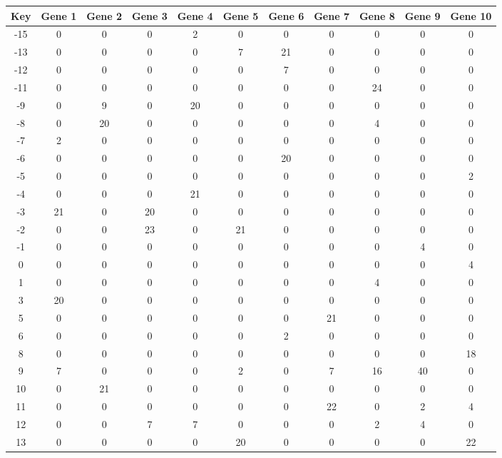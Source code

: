 \begin{tabular}{|c|c|c|c|c|c|c|c|c|c|c|}
\hline
Key & Gene 1 & Gene 2 & Gene 3 & Gene 4 & Gene 5 & Gene 6 & Gene 7 & Gene 8 & Gene 9 & Gene 10 \\
\hline
-15 & 0 & 0 & 0 & 2 & 0 & 0 & 0 & 0 & 0 & 0 \\
-13 & 0 & 0 & 0 & 0 & 7 & 21 & 0 & 0 & 0 & 0 \\
-12 & 0 & 0 & 0 & 0 & 0 & 7 & 0 & 0 & 0 & 0 \\
-11 & 0 & 0 & 0 & 0 & 0 & 0 & 0 & 24 & 0 & 0 \\
-9 & 0 & 9 & 0 & 20 & 0 & 0 & 0 & 0 & 0 & 0 \\
-8 & 0 & 20 & 0 & 0 & 0 & 0 & 0 & 4 & 0 & 0 \\
-7 & 2 & 0 & 0 & 0 & 0 & 0 & 0 & 0 & 0 & 0 \\
-6 & 0 & 0 & 0 & 0 & 0 & 20 & 0 & 0 & 0 & 0 \\
-5 & 0 & 0 & 0 & 0 & 0 & 0 & 0 & 0 & 0 & 2 \\
-4 & 0 & 0 & 0 & 21 & 0 & 0 & 0 & 0 & 0 & 0 \\
-3 & 21 & 0 & 20 & 0 & 0 & 0 & 0 & 0 & 0 & 0 \\
-2 & 0 & 0 & 23 & 0 & 21 & 0 & 0 & 0 & 0 & 0 \\
-1 & 0 & 0 & 0 & 0 & 0 & 0 & 0 & 0 & 4 & 0 \\
0 & 0 & 0 & 0 & 0 & 0 & 0 & 0 & 0 & 0 & 4 \\
1 & 0 & 0 & 0 & 0 & 0 & 0 & 0 & 4 & 0 & 0 \\
3 & 20 & 0 & 0 & 0 & 0 & 0 & 0 & 0 & 0 & 0 \\
5 & 0 & 0 & 0 & 0 & 0 & 0 & 21 & 0 & 0 & 0 \\
6 & 0 & 0 & 0 & 0 & 0 & 2 & 0 & 0 & 0 & 0 \\
8 & 0 & 0 & 0 & 0 & 0 & 0 & 0 & 0 & 0 & 18 \\
9 & 7 & 0 & 0 & 0 & 2 & 0 & 7 & 16 & 40 & 0 \\
10 & 0 & 21 & 0 & 0 & 0 & 0 & 0 & 0 & 0 & 0 \\
11 & 0 & 0 & 0 & 0 & 0 & 0 & 22 & 0 & 2 & 4 \\
12 & 0 & 0 & 7 & 7 & 0 & 0 & 0 & 2 & 4 & 0 \\
13 & 0 & 0 & 0 & 0 & 20 & 0 & 0 & 0 & 0 & 22 \\
\hline
\end{tabular}
